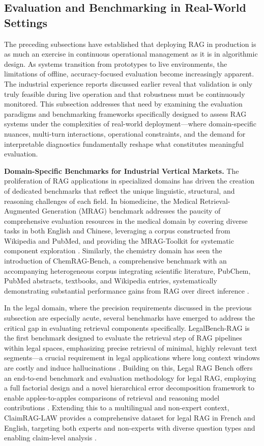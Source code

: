 \documentclass[11pt]{article}
\begin{document}
\subsection{Evaluation and Benchmarking in Real-World Settings}

The preceding subsections have established that deploying RAG in production is as much an exercise in continuous operational management as it is in algorithmic design. As systems transition from prototypes to live environments, the limitations of offline, accuracy-focused evaluation become increasingly apparent. The industrial experience reports discussed earlier reveal that validation is only truly feasible during live operation and that robustness must be continuously monitored. This subsection addresses that need by examining the evaluation paradigms and benchmarking frameworks specifically designed to assess RAG systems under the complexities of real-world deployment---where domain-specific nuances, multi-turn interactions, operational constraints, and the demand for interpretable diagnostics fundamentally reshape what constitutes meaningful evaluation.

\textbf{Domain-Specific Benchmarks for Industrial Vertical Markets.} The proliferation of RAG applications in specialized domains has driven the creation of dedicated benchmarks that reflect the unique linguistic, structural, and reasoning challenges of each field. In biomedicine, the Medical Retrieval-Augmented Generation (MRAG) benchmark addresses the paucity of comprehensive evaluation resources in the medical domain by covering diverse tasks in both English and Chinese, leveraging a corpus constructed from Wikipedia and PubMed, and providing the MRAG-Toolkit for systematic component exploration \cite{ref367}. Similarly, the chemistry domain has seen the introduction of ChemRAG-Bench, a comprehensive benchmark with an accompanying heterogeneous corpus integrating scientific literature, PubChem, PubMed abstracts, textbooks, and Wikipedia entries, systematically demonstrating substantial performance gains from RAG over direct inference \cite{ref400}.

In the legal domain, where the precision requirements discussed in the previous subsection are especially acute, several benchmarks have emerged to address the critical gap in evaluating retrieval components specifically. LegalBench-RAG is the first benchmark designed to evaluate the retrieval step of RAG pipelines within legal spaces, emphasizing precise retrieval of minimal, highly relevant text segments---a crucial requirement in legal applications where long context windows are costly and induce hallucinations \cite{ref563}. Building on this, Legal RAG Bench offers an end-to-end benchmark and evaluation methodology for legal RAG, employing a full factorial design and a novel hierarchical error decomposition framework to enable apples-to-apples comparisons of retrieval and reasoning model contributions \cite{ref581}. Extending this to a multilingual and non-expert context, ClaimRAG-LAW provides a comprehensive dataset for legal RAG in French and English, targeting both experts and non-experts with diverse question types and enabling claim-level analysis \cite{ref395}.
\end{document}
